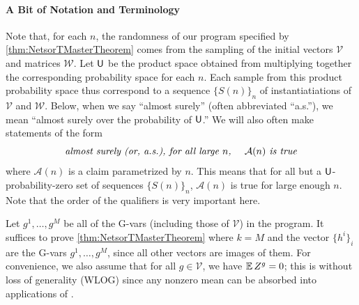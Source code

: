 \documentclass[main.tex]{subfiles}
\begin{document}
\paragraph{A Bit of Notation and Terminology}
Note that, for each $n$, the randomness of our program specified by \cref{thm:NetsorTMasterTheorem} comes from the sampling of the initial vectors $\mathcal V$ and matrices $\mathcal W$.
Let $\mathsf{U}$ be the product space obtained from multiplying together the corresponding probability space for each $n$.
Each sample from this product probability space thus correspond to a sequence $\{S(n)\}_n$ of instantiatiations of $\mathcal V$ and $\mathcal W$.
Below, when we say ``almost surely'' (often abbreviated ``a.s.''), we mean ``almost surely over the probability of $\mathsf{U}{}$.''
We will also often make statements of the form 
\begin{equation*}
\text{\emph{almost surely (or, a.s.), for all large $n$, \quad $\mathcal A(n)$ is true}}
\end{equation*}
where $\mathcal A(n)$ is a claim parametrized by $n$.
This means that for all but a $\mathsf{U}{}$-probability-zero set of sequences $\{S(n)\}_n$, $\mathcal A(n)$ is true for large enough $n$.
Note that the order of the qualifiers is very important here.

Let $g^1, \ldots, g^M$ be all of the G-vars (including those of $\mathcal V$) in the program.
It suffices to prove \cref{thm:NetsorTMasterTheorem} where $k=M$ and the vector $\{h^i\}_i$ are the G-vars $g^1, \ldots, g^M$, since all other vectors are  images of them.
For convenience, we also assume that for all $g\in \mathcal V$, we have $\operatorname*{\mathbb{E}} Z^g = 0$; this is without loss of generality (WLOG) since any nonzero mean can be absorbed into applications of .
\end{document}
